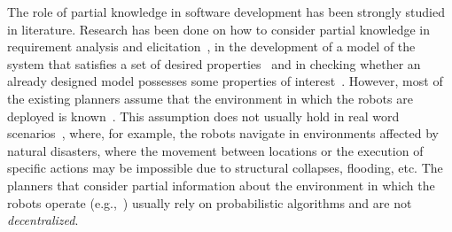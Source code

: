The role of partial knowledge in software development has been strongly studied in literature.
Research has been done on how to consider partial knowledge in requirement analysis and elicitation~\cite{menghi2017integrating,menghi2017cover,letier2008deriving}, in the development of a model of the system that satisfies a set of desired properties~\cite{uchitel2009synthesis,uchitel2013supporting,famelis2012partial,albarghouthi2012under,Bernasconi2017} and in checking   whether an  already designed model possesses some properties of interest~\cite{menghi2016dealing,bruns1999model,chechik2004multi}.
However, most of the existing planners assume that the environment in which the robots are deployed is known~\cite{7139412}. 
This assumption does not usually hold in real word scenarios~\cite{lahijanian2016iterative},  where, for example,  the robots navigate in environments affected by natural disasters, where the movement between locations or the execution of specific actions may be impossible due to structural collapses, flooding, etc.
The planners that consider  partial information about the environment in which the robots operate (e.g.,~\cite{roy2006planning,du2012robot,diaz2001exploring}) usually rely on probabilistic algorithms and are not  \emph{decentralized}.




